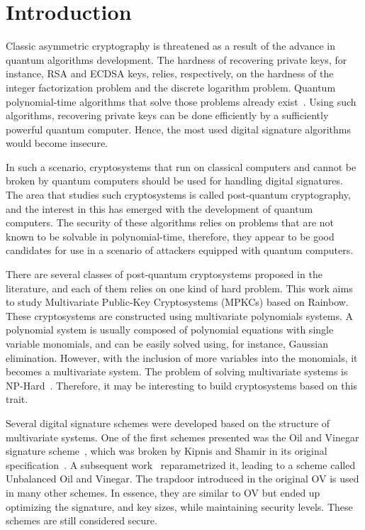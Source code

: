 \documentclass{ufsctex/ufsctex}
\makeatletter
\renewcommand{\listadeabreviaturas}{
	\pretextualchapter{List of Acronyms}\@starttoc{las}}
\renewcommand{\listadesimbolos}{
	\pretextualchapter{List of Symbols}\@starttoc{lsb}}
\renewcommand{\listadealgoritmos}{
	\pretextualchapter{List of Algorithms}\@starttoc{loa}}
\makeatother
\begin{document}
\capa{}
\pretextuais{}
\listadefiguras{}
\listadetabelas{}
\listadeabreviaturas{}
\sumario{}

\chapter{Introduction}

Classic asymmetric cryptography is threatened as a result of the advance in
quantum algorithms development. The hardness of recovering private keys, for
instance, RSA and ECDSA keys, relies, respectively, on the hardness
of the integer factorization problem and the discrete logarithm problem.
Quantum polynomial-time algorithms that solve those problems already
exist~\cite{shor1999polynomial}. Using such algorithms, recovering private keys
can be done efficiently by a sufficiently powerful quantum computer. Hence, the
most used digital signature algorithms would become insecure.

In such a scenario, cryptosystems that run on classical computers and cannot be
broken by quantum computers should be used for handling digital signatures. The
area that studies such cryptosystems is called post-quantum cryptography, and
the interest in this has emerged with the development of quantum computers. The
security of these algorithms relies on problems that are not known to be
solvable in polynomial-time, therefore, they appear to be good candidates for
use in a scenario of attackers equipped with quantum computers.

There are several classes of post-quantum cryptosystems proposed in the
literature, and each of them relies on one kind of hard problem. This work aims
to study Multivariate Public-Key Cryptosystems
(MPKCs) based on Rainbow.
These cryptosystems are constructed using multivariate polynomials systems. A
polynomial system is usually composed of polynomial equations with single
variable monomials, and can be easily solved using, for instance, Gaussian
elimination. However, with the inclusion of more variables into the monomials,
it becomes a multivariate system. The problem of solving multivariate systems
is NP-Hard~\cite{garey1979npc}. Therefore, it may be interesting to build
cryptosystems based on this trait.

Several digital signature schemes were developed based on the structure of
multivariate systems. One of the first schemes presented was the Oil and
Vinegar signature scheme~\cite{patarin1997ov}, which
was broken by Kipnis and Shamir in its original
specification~\cite{kipnis1998cryptanalysis}. A subsequent
work~\cite{kipnis1999unbalanced} reparametrized it, leading to a scheme called
Unbalanced Oil and Vinegar. The trapdoor
introduced in the original OV is used in many other schemes. In essence, they
are similar to OV but ended up optimizing the signature, and key sizes, while
maintaining security levels. These schemes are still considered secure.
\end{document}
